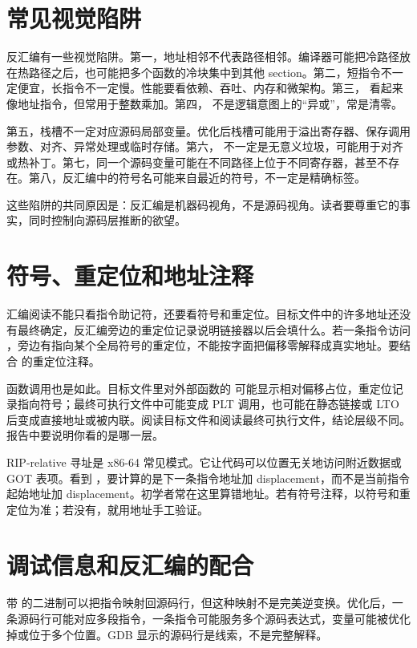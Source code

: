 \section{常见视觉陷阱}

反汇编有一些视觉陷阱。第一，地址相邻不代表路径相邻。编译器可能把冷路径放在热路径之后，也可能把多个函数的冷块集中到其他 section。第二，短指令不一定便宜，长指令不一定慢。性能要看依赖、吞吐、内存和微架构。第三， 看起来像地址指令，但常用于整数乘加。第四， 不是逻辑意图上的“异或”，常是清零。

第五，栈槽不一定对应源码局部变量。优化后栈槽可能用于溢出寄存器、保存调用参数、对齐、异常处理或临时存储。第六， 不一定是无意义垃圾，可能用于对齐或热补丁。第七，同一个源码变量可能在不同路径上位于不同寄存器，甚至不存在。第八，反汇编中的符号名可能来自最近的符号，不一定是精确标签。

这些陷阱的共同原因是：反汇编是机器码视角，不是源码视角。读者要尊重它的事实，同时控制向源码层推断的欲望。

\section{符号、重定位和地址注释}

汇编阅读不能只看指令助记符，还要看符号和重定位。目标文件中的许多地址还没有最终确定，反汇编旁边的重定位记录说明链接器以后会填什么。若一条指令访问 ，旁边有指向某个全局符号的重定位，不能按字面把偏移零解释成真实地址。要结合  的重定位注释。

函数调用也是如此。目标文件里对外部函数的  可能显示相对偏移占位，重定位记录指向符号；最终可执行文件中可能变成 PLT 调用，也可能在静态链接或 LTO 后变成直接地址或被内联。阅读目标文件和阅读最终可执行文件，结论层级不同。报告中要说明你看的是哪一层。

RIP-relative 寻址是 x86-64 常见模式。它让代码可以位置无关地访问附近数据或 GOT 表项。看到 ，要计算的是下一条指令地址加 displacement，而不是当前指令起始地址加 displacement。初学者常在这里算错地址。若有符号注释，以符号和重定位为准；若没有，就用地址手工验证。

\section{调试信息和反汇编的配合}

带  的二进制可以把指令映射回源码行，但这种映射不是完美逆变换。优化后，一条源码行可能对应多段指令，一条指令可能服务多个源码表达式，变量可能被优化掉或位于多个位置。GDB 显示的源码行是线索，不是完整解释。

